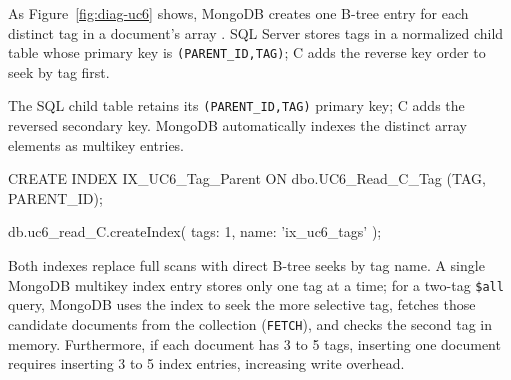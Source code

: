 As Figure~\ref{fig:diag-uc6} shows, MongoDB creates one B-tree entry for each distinct tag in a document's array \cite{mongomultikey}. SQL Server stores tags in a normalized child table whose primary key is \texttt{(PARENT\_ID,TAG)}; C adds the reverse key order to seek by tag first.

The SQL child table retains its \texttt{(PARENT\_ID,TAG)} primary key; C adds the reversed secondary key. MongoDB automatically indexes the distinct array elements as multikey entries.
\begin{SQLCode}
CREATE INDEX IX_UC6_Tag_Parent
ON dbo.UC6_Read_C_Tag (TAG, PARENT_ID);
\end{SQLCode}
\begin{MongoCode}
db.uc6_read_C.createIndex(
  {tags: 1}, {name: 'ix_uc6_tags'}
);
\end{MongoCode}

Both indexes replace full scans with direct B-tree seeks by tag name. 
A single MongoDB multikey index entry stores only one tag at a time; for a two-tag \texttt{\$all} query, MongoDB uses the index to seek the more selective tag, fetches those candidate documents from the collection (\texttt{FETCH}), and checks the second tag in memory. Furthermore, if each document has 3 to 5 tags, inserting one document requires inserting 3 to 5 index entries, increasing write overhead.


\UCSixDiagram
\FloatBarrier
